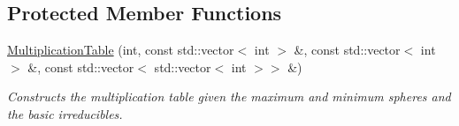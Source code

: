 \subsection*{Protected Member Functions}
\begin{DoxyCompactItemize}
\item 
\hyperlink{classMackey_1_1MultiplicationTable_a8530e27d8d2c3c755eb5041a2ee8c35b}{Multiplication\+Table} (int, const std\+::vector$<$ int $>$ \&, const std\+::vector$<$ int $>$ \&, const std\+::vector$<$ std\+::vector$<$ int $>$$>$ \&)
\begin{DoxyCompactList}\small\item\em Constructs the multiplication table given the maximum and minimum spheres and the basic irreducibles. \end{DoxyCompactList}\end{DoxyCompactItemize}
